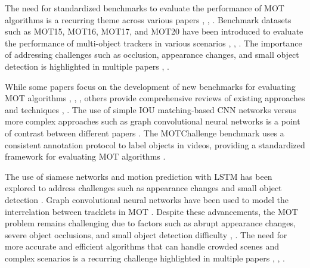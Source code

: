 \documentclass[conference]{IEEEtran}
\begin{document}
The need for standardized benchmarks to evaluate the performance of MOT algorithms is a recurring theme across various papers \cite{MOTChallenge: A Benchmark for Multi-Object Tracking}, \cite{MOT16: A Benchmark for Multi-Object Tracking}, \cite{MOT20: A Benchmark for Multi-Object Tracking in Crowded Scenes}. Benchmark datasets such as MOT15, MOT16, MOT17, and MOT20 have been introduced to evaluate the performance of multi-object trackers in various scenarios \cite{MOTChallenge: A Benchmark for Multi-Object Tracking}, \cite{MOT16: A Benchmark for Multi-Object Tracking}, \cite{MOT20: A Benchmark for Multi-Object Tracking in Crowded Scenes}. The importance of addressing challenges such as occlusion, appearance changes, and small object detection is highlighted in multiple papers \cite{Multiple Object Tracking: A Review}, \cite{A Comprehensive Review of Multiple Object Tracking Techniques}.

While some papers focus on the development of new benchmarks for evaluating MOT algorithms \cite{MOTChallenge: A Benchmark for Multi-Object Tracking}, \cite{MOT16: A Benchmark for Multi-Object Tracking}, \cite{MOT20: A Benchmark for Multi-Object Tracking in Crowded Scenes}, others provide comprehensive reviews of existing approaches and techniques \cite{Multiple Object Tracking: A Review}, \cite{A Comprehensive Review of Multiple Object Tracking Techniques}. The use of simple IOU matching-based CNN networks versus more complex approaches such as graph convolutional neural networks is a point of contrast between different papers \cite{Multiple Object Tracking: A Review}. The MOTChallenge benchmark uses a consistent annotation protocol to label objects in videos, providing a standardized framework for evaluating MOT algorithms \cite{MOTChallenge: A Benchmark for Multi-Object Tracking}.

The use of siamese networks and motion prediction with LSTM has been explored to address challenges such as appearance changes and small object detection \cite{Multiple Object Tracking: A Review}. Graph convolutional neural networks have been used to model the interrelation between tracklets in MOT \cite{Multiple Object Tracking: A Review}. Despite these advancements, the MOT problem remains challenging due to factors such as abrupt appearance changes, severe object occlusions, and small object detection difficulty \cite{Multiple Object Tracking: A Review}, \cite{A Comprehensive Review of Multiple Object Tracking Techniques}. The need for more accurate and efficient algorithms that can handle crowded scenes and complex scenarios is a recurring challenge highlighted in multiple papers \cite{MOTChallenge: A Benchmark for Multi-Object Tracking}, \cite{MOT16: A Benchmark for Multi-Object Tracking}, \cite{MOT20: A Benchmark for Multi-Object Tracking in Crowded Scenes}.
\end{document}
